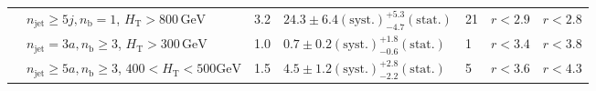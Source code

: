 \begin{table}[h!]
\begin{tabular}{ lllllll }
 & $n_{\mathrm{jet}} \geq5j,n_{\mathrm{b}} =1$, $H_{\mathrm{T}} > 800 \, \mathrm{GeV}$ & 3.2 & $24.3 \pm 6.4 \mathrm{(syst.)} ^{+5.3}_{-4.7} \mathrm{(stat.)}$ & 21 & $r < 2.9$ & $r < 2.8$\\ 
 & $n_{\mathrm{jet}} =3a,n_{\mathrm{b}} \geq3$, $H_{\mathrm{T}} > 300 \, \mathrm{GeV}$ & 1.0 & $0.7 \pm 0.2 \mathrm{(syst.)} ^{+1.8}_{-0.6} \mathrm{(stat.)}$ & 1 & $r < 3.4$ & $r < 3.8$\\ 
 & $n_{\mathrm{jet}} \geq5a,n_{\mathrm{b}} \geq3$, $400 < H_{\mathrm{T}} < 500 \mathrm{GeV}$ & 1.5 & $4.5 \pm 1.2 \mathrm{(syst.)} ^{+2.8}_{-2.2} \mathrm{(stat.)}$ & 5 & $r < 3.6$ & $r < 4.3$\\ 
    \hline
  \end{tabular}
\end{table}


\clearpage
